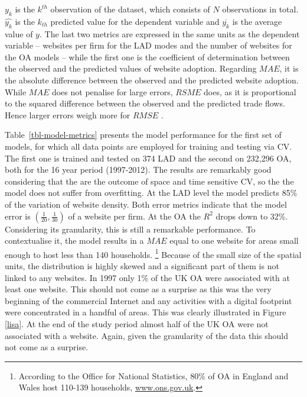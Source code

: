 \documentclass[
  authoryear,
  preprint,
  3p]{elsarticle}
\begin{document}
\noindent \(y_{k}\) is the \(k^{th}\) observation of the dataset, which
consists of \(N\) observations in total. \(\hat{y_{k}}\) is the
\(k_{th}\) predicted value for the dependent variable and
\(\overline{y_{k}}\) is the average value of \(y\). The last two metrics
are expressed in the same units as the dependent variable -- websites
per firm for the LAD modes and the number of websites for the OA models
-- while the first one is the coefficient of determination between the
observed and the predicted values of website adoption. Regarding
\(MAE\), it is the absolute difference between the observed and the
predicted website adoption. While \(MAE\) does not penalise for large
errors, \(RSME\) does, as it is proportional to the squared difference
between the observed and the predicted trade flows. Hence larger errors
weigh more for \(RMSE\) \citep{pontius2008components}.

Table~\ref{tbl-model-metrics} presents the model performance for the
first set of models, for which all data points are employed for training
and testing via CV. The first one is trained and tested on 374 LAD and
the second on 232,296 OA, both for the 16 year period (1997-2012). The
results are remarkably good considering that the are the outcome of
space and time sensitive CV, so the the model does not suffer from
overfitting. At the LAD level the model predicts 85\% of the variation
of website density. Both error metrics indicate that the model error is
\((\frac{1}{20}, \frac{1}{30})\) of a website per firm. At the OA the
\(R^2\) drops down to 32\%. Considering its granularity, this is still a
remarkable performance. To contextualise it, the model results in a
\(MAE\) equal to one website for areas small enough to host less than
140 households. \footnote{According to the Office for National
  Statistics, 80\% of OA in England and Wales host 110-139 households,
  \href{https://www.ons.gov.uk/census/2001censusandearlier/dataandproducts/outputgeography/outputareas}{www.ons.gov.uk}.}
Because of the small size of the spatial units, the distribution is
highly skewed and a significant part of them is not linked to any
websites. In 1997 only 1\% of the UK OA were associated with at least
one website. This should not come as a surprise as this was the very
beginning of the commercial Internet and any activities with a digital
footprint were concentrated in a handful of areas. This was clearly
illustrated in Figure \ref{lisa}. At the end of the study period almost
half of the UK OA were not associated with a website. Again, given the
granularity of the data this should not come as a surprise.
\end{document}
